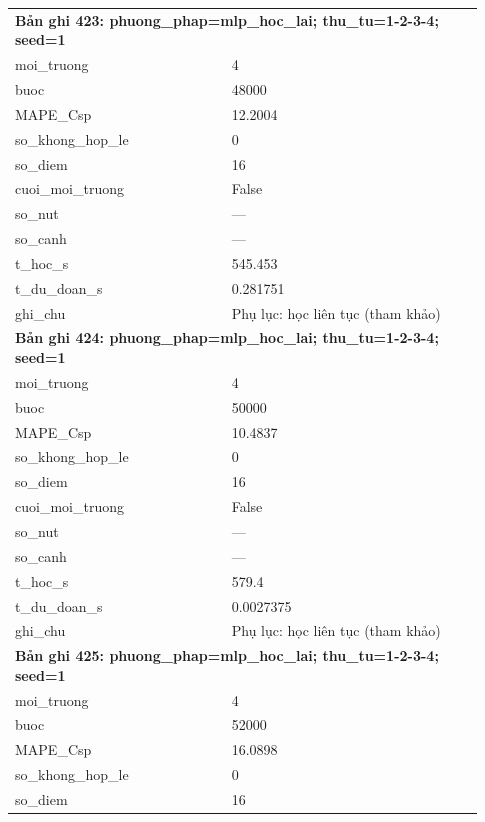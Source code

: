 \begin{longtable}{p{0.43\linewidth}p{0.50\linewidth}}
\midrule
\multicolumn{2}{p{0.95\linewidth}}{\textbf{Bản ghi 423: phuong\_phap=mlp\_hoc\_lai; thu\_tu=1-2-3-4; seed=1}} \\
moi\_\allowbreak truong & 4 \\
buoc & 48000 \\
MAPE\_\allowbreak Csp & 12.2004 \\
so\_\allowbreak khong\_\allowbreak hop\_\allowbreak le & 0 \\
so\_\allowbreak diem & 16 \\
cuoi\_\allowbreak moi\_\allowbreak truong & False \\
so\_\allowbreak nut & — \\
so\_\allowbreak canh & — \\
t\_\allowbreak hoc\_\allowbreak s & 545.453 \\
t\_\allowbreak du\_\allowbreak doan\_\allowbreak s & 0.281751 \\
ghi\_\allowbreak chu & Phụ lục: học liên tục (tham khảo) \\
\midrule
\multicolumn{2}{p{0.95\linewidth}}{\textbf{Bản ghi 424: phuong\_phap=mlp\_hoc\_lai; thu\_tu=1-2-3-4; seed=1}} \\
moi\_\allowbreak truong & 4 \\
buoc & 50000 \\
MAPE\_\allowbreak Csp & 10.4837 \\
so\_\allowbreak khong\_\allowbreak hop\_\allowbreak le & 0 \\
so\_\allowbreak diem & 16 \\
cuoi\_\allowbreak moi\_\allowbreak truong & False \\
so\_\allowbreak nut & — \\
so\_\allowbreak canh & — \\
t\_\allowbreak hoc\_\allowbreak s & 579.4 \\
t\_\allowbreak du\_\allowbreak doan\_\allowbreak s & 0.0027375 \\
ghi\_\allowbreak chu & Phụ lục: học liên tục (tham khảo) \\
\midrule
\multicolumn{2}{p{0.95\linewidth}}{\textbf{Bản ghi 425: phuong\_phap=mlp\_hoc\_lai; thu\_tu=1-2-3-4; seed=1}} \\
moi\_\allowbreak truong & 4 \\
buoc & 52000 \\
MAPE\_\allowbreak Csp & 16.0898 \\
so\_\allowbreak khong\_\allowbreak hop\_\allowbreak le & 0 \\
so\_\allowbreak diem & 16 \\

\end{longtable}
